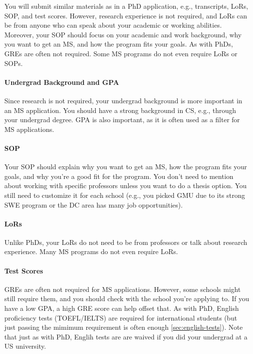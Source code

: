 \documentclass[oneside,11pt,dvipsnames]{book}
\begin{document}
You will submit similar materials as in a PhD application, e.g., transcripts, LoRs, SOP, and test scores.  However, research experience is not required, and LoRs can be from anyone who can speak about your academic or working abilities. Moreover, your SOP should focus on your academic and work background, why you want to get an MS, and how the program fits your goals. As with PhDs, GREs are often not required. Some MS programs do not even require LoRs or SOPs.  

\paragraph{Undergrad Background and GPA} Since research is not required, your undergrad background is more important in an MS application.  You should have a strong background in CS, e.g., through your undergrad degree.  GPA is also important, as it is often used as a filter for MS applications.

\paragraph{SOP} Your SOP should explain why you want to get an MS, how the program fits your goals, and why you're a good fit for the program.  You don't need to mention about working with specific professors unless you want to do a thesis option. You still need to customize it for each school (e.g., you picked GMU due to its strong SWE program or the DC area has many job opportunities).

\paragraph{LoRs} Unlike PhDs, your LoRs do not need to be from professors or talk about research experience. Many MS programs do not even require LoRs.

\paragraph{Test Scores} GREs are often not required for MS applications.  However, some schools might still require them, and you should check with the school you're applying to.  If you have a low GPA, a high GRE score can help offset that. As with PhD, English proficiency tests (TOEFL/IELTS) are required for international students (but just passing the mimimum requirement is often enough \autoref{sec:english-tests}). Note that just as with PhD, Englih tests are are waived if you did your undergrad at a US university.
\end{document}
